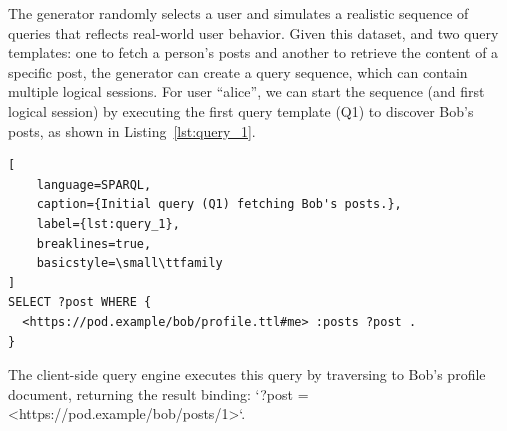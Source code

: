 





The generator randomly selects a user and simulates
a realistic sequence of queries that reflects real-world user behavior. 
Given this dataset, and two query 
templates: one to fetch a person's posts and another to retrieve the 
content of a specific post, the generator can create a query sequence, which can contain multiple
logical sessions.
For user ``alice'', we can start the sequence (and first logical session) by 
executing the first query template (Q1) to discover Bob's posts, 
as shown in Listing~\ref{lst:query_1}.

\begin{lstlisting}[
    language=SPARQL,
    caption={Initial query (Q1) fetching Bob's posts.},
    label={lst:query_1},
    breaklines=true,
    basicstyle=\small\ttfamily
]
SELECT ?post WHERE {
  <https://pod.example/bob/profile.ttl#me> :posts ?post .
}
\end{lstlisting}

The client-side query engine executes this query by traversing to Bob's 
profile document, returning the result binding: 
`?post = <https://pod.example/bob/posts/1>`.

